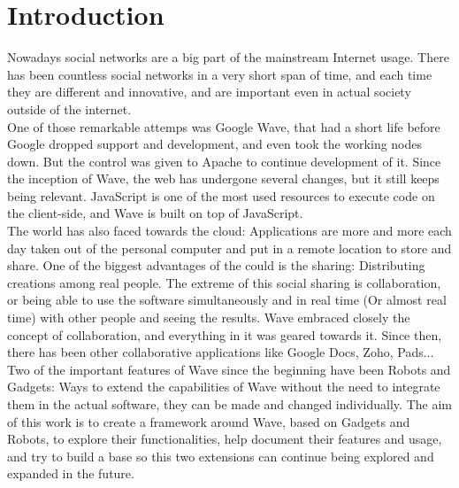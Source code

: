\newpage
{}
\section{Introduction}
Nowadays social networks are a big part of the mainstream Internet usage. There has been countless social networks in a very short span of time, and each time they are different and innovative, and are important even in actual society outside of the internet.\\[.2cm]
One of those remarkable attemps was Google Wave, that had a short life before Google dropped support and development, and even took the working nodes down. But the control was given to Apache to continue development of it. Since the inception of Wave, the web has undergone several changes, but it still keeps being relevant. JavaScript is one of the most used resources to execute code on the client-side, and Wave is built on top of JavaScript.\\[.2cm]
The world has also faced towards the cloud: Applications are more and more each day taken out of the personal computer and put in a remote location to store and share. One of the biggest advantages of the could is the sharing: Distributing creations among real people. The extreme of this social sharing is collaboration, or being able to use the software simultaneously and in real time (Or almost real time) with other people and seeing the results. Wave embraced closely the concept of collaboration, and everything in it was geared towards it. Since then, there has been other collaborative applications like Google Docs, Zoho, Pads...\\[.2cm]
Two of the important features of Wave since the beginning have been Robots and Gadgets: Ways to extend the capabilities of Wave without the need to integrate them in the actual software, they can be made and changed individually. The aim of this work is to create a framework around Wave, based on Gadgets and Robots, to explore their functionalities, help document their features and usage, and try to build a base so this two extensions can continue being explored and expanded in the future.
